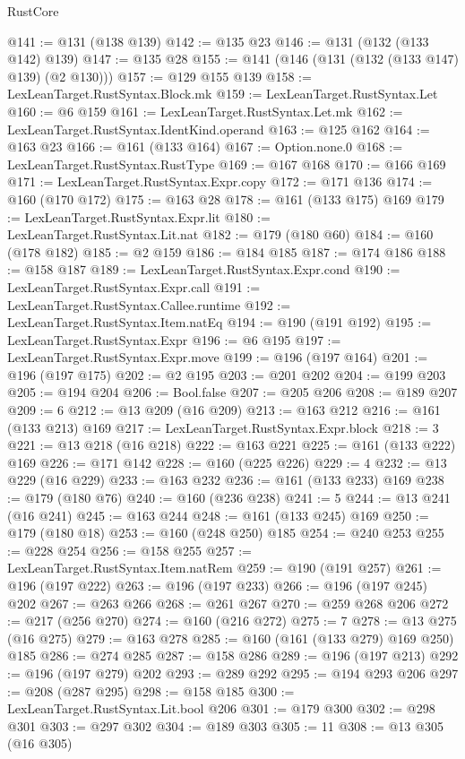\begin{lexlean}{RustCore}
\begin{coremodule}
@141 := @131 (@138 @139)
@142 := @135 @23
@146 := @131 (@132 (@133 @142) @139)
@147 := @135 @28
@155 := @141 (@146 (@131 (@132 (@133 @147) @139) (@2 @130)))
@157 := @129 @155 @139
@158 := LexLeanTarget.RustSyntax.Block.mk
@159 := LexLeanTarget.RustSyntax.Let
@160 := @6 @159
@161 := LexLeanTarget.RustSyntax.Let.mk
@162 := LexLeanTarget.RustSyntax.IdentKind.operand
@163 := @125 @162
@164 := @163 @23
@166 := @161 (@133 @164)
@167 := Option.none.{0}
@168 := LexLeanTarget.RustSyntax.RustType
@169 := @167 @168
@170 := @166 @169
@171 := LexLeanTarget.RustSyntax.Expr.copy
@172 := @171 @136
@174 := @160 (@170 @172)
@175 := @163 @28
@178 := @161 (@133 @175) @169
@179 := LexLeanTarget.RustSyntax.Expr.lit
@180 := LexLeanTarget.RustSyntax.Lit.nat
@182 := @179 (@180 @60)
@184 := @160 (@178 @182)
@185 := @2 @159
@186 := @184 @185
@187 := @174 @186
@188 := @158 @187
@189 := LexLeanTarget.RustSyntax.Expr.cond
@190 := LexLeanTarget.RustSyntax.Expr.call
@191 := LexLeanTarget.RustSyntax.Callee.runtime
@192 := LexLeanTarget.RustSyntax.Item.natEq
@194 := @190 (@191 @192)
@195 := LexLeanTarget.RustSyntax.Expr
@196 := @6 @195
@197 := LexLeanTarget.RustSyntax.Expr.move
@199 := @196 (@197 @164)
@201 := @196 (@197 @175)
@202 := @2 @195
@203 := @201 @202
@204 := @199 @203
@205 := @194 @204
@206 := Bool.false
@207 := @205 @206
@208 := @189 @207
@209 := 6
@212 := @13 @209 (@16 @209)
@213 := @163 @212
@216 := @161 (@133 @213) @169
@217 := LexLeanTarget.RustSyntax.Expr.block
@218 := 3
@221 := @13 @218 (@16 @218)
@222 := @163 @221
@225 := @161 (@133 @222) @169
@226 := @171 @142
@228 := @160 (@225 @226)
@229 := 4
@232 := @13 @229 (@16 @229)
@233 := @163 @232
@236 := @161 (@133 @233) @169
@238 := @179 (@180 @76)
@240 := @160 (@236 @238)
@241 := 5
@244 := @13 @241 (@16 @241)
@245 := @163 @244
@248 := @161 (@133 @245) @169
@250 := @179 (@180 @18)
@253 := @160 (@248 @250) @185
@254 := @240 @253
@255 := @228 @254
@256 := @158 @255
@257 := LexLeanTarget.RustSyntax.Item.natRem
@259 := @190 (@191 @257)
@261 := @196 (@197 @222)
@263 := @196 (@197 @233)
@266 := @196 (@197 @245) @202
@267 := @263 @266
@268 := @261 @267
@270 := @259 @268 @206
@272 := @217 (@256 @270)
@274 := @160 (@216 @272)
@275 := 7
@278 := @13 @275 (@16 @275)
@279 := @163 @278
@285 := @160 (@161 (@133 @279) @169 @250) @185
@286 := @274 @285
@287 := @158 @286
@289 := @196 (@197 @213)
@292 := @196 (@197 @279) @202
@293 := @289 @292
@295 := @194 @293 @206
@297 := @208 (@287 @295)
@298 := @158 @185
@300 := LexLeanTarget.RustSyntax.Lit.bool @206
@301 := @179 @300
@302 := @298 @301
@303 := @297 @302
@304 := @189 @303
@305 := 11
@308 := @13 @305 (@16 @305)

\end{coremodule}
\end{lexlean}
